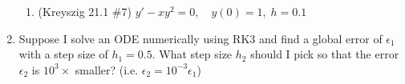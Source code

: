 \documentclass[letterpaper, fontsize=12pt]{scrartcl} %
\numberwithin{equation}{section} %
\numberwithin{figure}{section} %
\numberwithin{table}{section} %
\begin{document}
\begin{enumerate}
\begin{enumerate}
\item (Kreyszig 21.1 \#7) $y' - xy^2 = 0, \quad y(0) =1,\;  h= 0.1$

\end{enumerate}

\item Suppose I solve an ODE numerically using RK3 and find a global error of $\epsilon_1$ with a step size of $h_1 = 0.5$. What step size $h_2$ should I pick so that the error $\epsilon_2$ is $10^3\times$ smaller? (i.e. $\epsilon_2 = 10^{-3} \epsilon_1$)

\end{enumerate}

\end{document}
